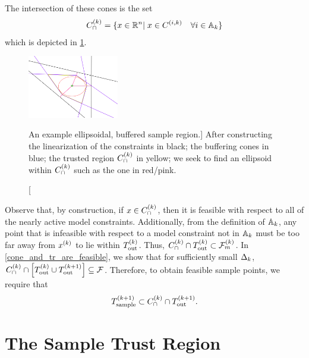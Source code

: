 The intersection of these cones is the set
\begin{align}
{C^{(k)}_{\cap}} = \{x\in\mathbb R^n | \; x \in {C^{(i, k)}} \quad \forall i \in {\mathbb A_{k}} \} \label{define_capcones}
\end{align}
which is depicted in \cref{completed_2}.

\begin{figure}[ht]
    \centering
    \includegraphics[width=150px]{images/completed_2.png}
    \caption
    	[An example ellipsoidal, buffered sample region.]{
    	After constructing 
    	the linearization of the constraints in black;
    	the buffering cones in blue;
    	the trusted region ${C^{(k)}_{\cap}}$ in yellow;
    	we seek to find an ellipsoid within ${C^{(k)}_{\cap}}$ such as the one in red/pink.
	}
    \label{completed_2}
\end{figure}

Observe that, by construction,  if $x \in {C^{(k)}_{\cap}}$, then it is feasible with respect to all of the nearly active model constraints.
Additionally,  from the definition of ${\mathbb A_{k}}$, any point that is infeasible with respect to a model constraint not in ${\mathbb A_{k}}$
must be too far away from $x^{(k)}$ to lie within  ${T_{\text{out}}^{(k)}}$.
Thus,  ${C^{(k)}_{\cap}} \cap {T_{\text{out}}^{(k)}} \subset {\mathcal F_m^{(k)}}$.
In \cref{cone_and_tr_are_feasible}, we show that for sufficiently small $\Delta_k$, ${C^{(k)}_{\cap}} \cap \left[{T_{\text{out}}^{(k)}} \cup {T_{\text{out}}^{(k+1)}}\right] \subseteq {\mathcal F}$.
Therefore, to obtain feasible sample points, we require that 
\begin{align*}
{T_{\text{sample}}^{(k+1)}} \subset {C^{(k)}_{\cap}} \cap {T_{\text{out}}^{(k+1)}}.
\end{align*}





\section{The Sample Trust Region}
\label{possible_ellipsoids}

